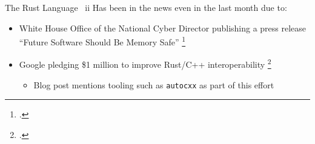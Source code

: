 \documentclass[10pt,aspectratio=169]{beamer}
\begin{document}
\begin{frame}{The Rust Language \ ii}
    Has been in the news even in the last month due to:
    \begin{itemize}
        \item White House Office of the National Cyber Director publishing a press release ``Future Software Should Be Memory Safe'' \footcite{PressReleaseFuture2024}  %
        \item Google pledging \$1 million to improve Rust/C++ interoperability \footcite{ImprovingInteroperabilityRust}  %
        \begin{itemize}
            \item<2-> \alert{Blog post mentions tooling such as \texttt{autocxx} as part of this effort}
        \end{itemize}
    \end{itemize}

    \vspace{0.5cm}
\end{frame}
\end{document}
